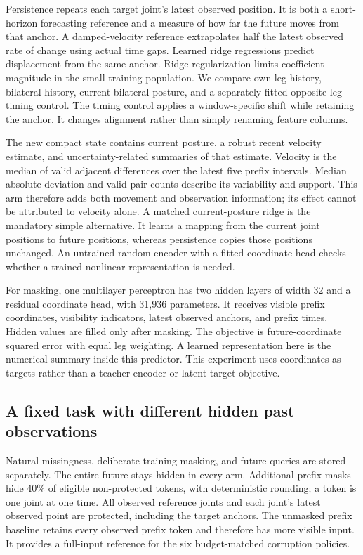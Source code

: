 \documentclass[letterpaper]{article}
\begin{document}
Persistence repeats each target joint's latest observed position. It is both a short-horizon forecasting reference and a measure of how far the future moves from that anchor. A damped-velocity reference extrapolates half the latest observed rate of change using actual time gaps. Learned ridge regressions predict displacement from the same anchor. Ridge regularization limits coefficient magnitude in the small training population. We compare own-leg history, bilateral history, current bilateral posture, and a separately fitted opposite-leg timing control. The timing control applies a window-specific shift while retaining the anchor. It changes alignment rather than simply renaming feature columns.

The new compact state contains current posture, a robust recent velocity estimate, and uncertainty-related summaries of that estimate. Velocity is the median of valid adjacent differences over the latest five prefix intervals. Median absolute deviation and valid-pair counts describe its variability and support. This arm therefore adds both movement and observation information; its effect cannot be attributed to velocity alone. A matched current-posture ridge is the mandatory simple alternative. It learns a mapping from the current joint positions to future positions, whereas persistence copies those positions unchanged. An untrained random encoder with a fitted coordinate head checks whether a trained nonlinear representation is needed.

For masking, one multilayer perceptron has two hidden layers of width 32 and a residual coordinate head, with 31,936 parameters. It receives visible prefix coordinates, visibility indicators, latest observed anchors, and prefix times. Hidden values are filled only after masking. The objective is future-coordinate squared error with equal leg weighting. A learned representation here is the numerical summary inside this predictor. This experiment uses coordinates as targets rather than a teacher encoder or latent-target objective.

\subsection{A fixed task with different hidden past observations}

Natural missingness, deliberate training masking, and future queries are stored separately. The entire future stays hidden in every arm. Additional prefix masks hide 40\% of eligible non-protected tokens, with deterministic rounding; a token is one joint at one time. All observed reference joints and each joint's latest observed point are protected, including the target anchors. The unmasked prefix baseline retains every observed prefix token and therefore has more visible input. It provides a full-input reference for the six budget-matched corruption policies.
\end{document}
